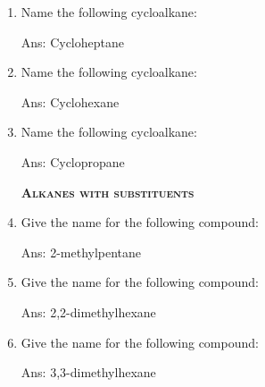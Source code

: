 \documentclass[main.tex]{subfiles}
\begin{document}
\begin{multicols*}{2}
\begin{enumerate}
\item Name the following cycloalkane:
\begin{center}\end{center}
\begin{flushright}\small Ans: Cycloheptane\end{flushright}

\item Name the following cycloalkane:
\begin{center}
\end{center}
\begin{flushright}\small Ans: Cyclohexane\end{flushright}

\item Name the following cycloalkane:
\begin{center}
\end{center}
\begin{flushright}\small Ans: Cyclopropane\end{flushright}

{\raggedright\textsc{\textbf{Alkanes with substituents}}\par}

\item Give the name for the following compound:
\begin{center}
\end{center}
\begin{flushright}\small Ans: 2-methylpentane\end{flushright}

\item Give the name for the following compound:
\begin{center}
\end{center}
\begin{flushright}\small Ans: 2,2-dimethylhexane\end{flushright}

\item Give the name for the following compound:
\begin{center}
\end{center}
\begin{flushright}\small Ans: 3,3-dimethylhexane\end{flushright}


\end{enumerate}
\end{multicols*}
\end{document}

